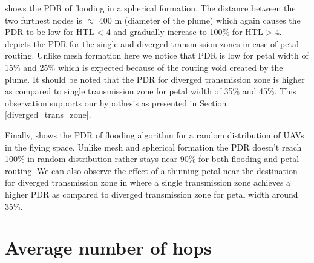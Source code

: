  shows the PDR of flooding in a spherical formation. The distance between the two furthest nodes is $\approx$ 400 m (diameter of the plume) which again causes the PDR to be low for HTL < 4 and gradually increase to 100\% for HTL > 4.  depicts the PDR for the single and diverged transmission zones in case of petal routing. Unlike mesh formation here we notice that PDR is low for petal width of 15\% and 25\% which is expected because of the routing void created by the plume. It should be noted that the PDR for diverged transmission zone is higher as compared to single transmission zone for petal width of 35\% and 45\%. This observation supports our hypothesis as presented in Section \ref{diverged_trans_zone}.

Finally,  shows the PDR of flooding algorithm for a random distribution of UAVs in the flying space. Unlike mesh and spherical formation the PDR doesn't reach 100\% in random distribution rather stays near 90\% for both flooding and petal routing. We can also observe the effect of a thinning petal near the destination for diverged transmission zone in  where a single transmission zone achieves a higher PDR as compared to diverged transmission zone for petal width around 35\%.

\section{Average number of hops}

